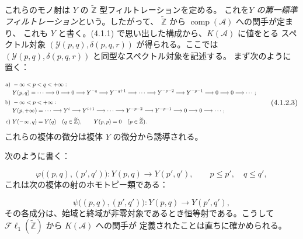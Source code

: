 \clearpage
{}%
\begingroup\small\setlength{\parskip}{0pt}\setlength{\emergencystretch}{1.5em}
\setlength{\abovedisplayskip}{4pt plus 2pt minus 2pt}%
\setlength{\belowdisplayskip}{4pt plus 2pt minus 2pt}%

これらのモノ射は $Y$ の $\widetilde{\mathbb Z}$ 型フィルトレーションを定める。
これを\emph{$Y$ の第一標準フィルトレーション}という。したがって、
$\widetilde{\mathbb Z}$ から $\operatorname{comp}(\mathcal A)$ への関手が定まり、
これも $Y$ と書く。(4.1.1) で思い出した構成から、$K(\mathcal A)$ に値をとる
スペクトル対象 $(\mathcal Y(p,q),\delta(p,q,r))$ が得られる。ここでは
$(\mathcal Y(p,q),\delta(p,q,r))$ と同型なスペクトル対象を記述する。
まず次のように置く：

\begin{equation}
\resizebox{0.98\textwidth}{!}{%
$\displaystyle
\begin{aligned}
\text{a) }& -\infty<p<q<+\infty:\\[-2pt]
&Y(p,q)=\cdots\longrightarrow0\longrightarrow0\longrightarrow Y^{-q}
\longrightarrow Y^{-q+1}\longrightarrow\cdots\longrightarrow Y^{-p-2}
\longrightarrow Y^{-p-1}\longrightarrow0\longrightarrow0
\longrightarrow\cdots;\\[2pt]
\text{b) }& -\infty<p<+\infty:\\[-2pt]
&Y(p,+\infty)=\cdots\longrightarrow Y^i\longrightarrow Y^{i+1}
\longrightarrow\cdots\longrightarrow Y^{-p-2}\longrightarrow Y^{-p-1}
\longrightarrow0\longrightarrow0\longrightarrow\cdots;\\[2pt]
\text{c) }&Y(-\infty,q)=Y(q)\quad(q\in\widetilde{\mathbb Z}),\qquad
Y(p,p)=0\quad(p\in\widetilde{\mathbb Z}).
\end{aligned}$%
}
\tag{4.1.2.3}
\end{equation}
これらの複体の微分は複体 $Y$ の微分から誘導される。

次のように書く：

\begin{equation}
\varphi\bigl((p,q),(p',q')\bigr)\colon
Y(p,q)\longrightarrow Y(p',q'),\qquad p\leq p',\quad q\leq q',
\tag{4.1.2.4}
\end{equation}
これは次の複体の射のホモトピー類である：

\begin{equation}
\psi\bigl((p,q),(p',q')\bigr)\colon
Y(p,q)\longrightarrow Y(p',q'),
\tag{4.1.2.5}
\end{equation}
その各成分は、始域と終域が非零対象であるとき恒等射である。こうして
$\mathcal{F}\ell_1(\widetilde{\mathbb Z})$ から $K(\mathcal A)$ への関手が
定義されたことは直ちに確かめられる。

